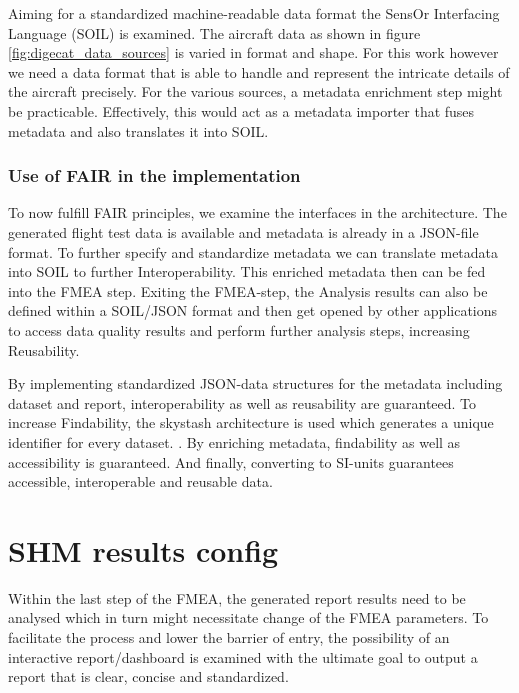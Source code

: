Aiming for a standardized machine-readable data format the SensOr Interfacing Language (SOIL) is examined. The aircraft data as shown in figure \ref{fig:digecat_data_sources} is varied in format and shape. For this work however we need a data format that is able to handle and represent the intricate details of the aircraft precisely. For the various sources, a metadata enrichment step might be practicable. Effectively, this would act as a metadata importer that fuses metadata and also translates it into SOIL.





\subsubsection{Use of FAIR in the implementation}
To now fulfill FAIR principles, we examine the interfaces in the architecture.
The generated flight test data is available and metadata is already in a JSON-file format. To further specify and standardize metadata we can translate metadata into SOIL to further Interoperability. This enriched metadata then can be fed into the FMEA step. Exiting the FMEA-step, the Analysis results can also be defined within a SOIL/JSON format and then get opened by other applications to access data quality results and perform further analysis steps, increasing Reusability.


By implementing standardized JSON-data structures for the metadata including dataset and report, interoperability as well as reusability are guaranteed. To increase Findability, the skystash architecture is used which generates a unique identifier for every dataset. \cite{meyer_development_2020}.
By enriching metadata, findability as well as accessibility is guaranteed.
And finally, converting to SI-units guarantees accessible, interoperable and reusable data.

\newpage


\section{SHM results config}

Within the last step of the FMEA, the generated report results need to be analysed which in turn might necessitate change of the FMEA parameters. To facilitate the process and lower the barrier of entry, the possibility of an interactive report/dashboard is examined with the ultimate goal to output a report that is clear, concise and standardized.

